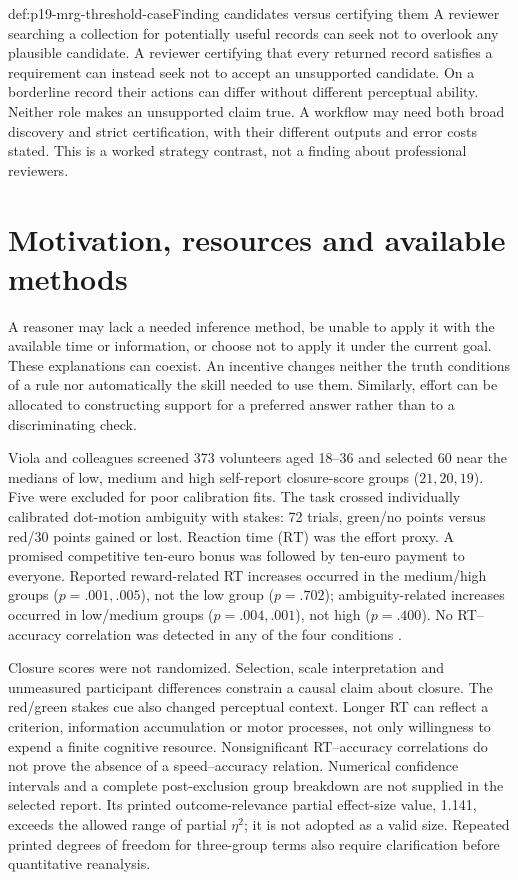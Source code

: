 \begin{hbexample}{def:p19-mrg-threshold-case}{Finding candidates versus certifying them}
A reviewer searching a collection for potentially useful records can seek
not to overlook any plausible candidate. A reviewer certifying that every
returned record satisfies a requirement can instead seek not to accept
an unsupported candidate. On a borderline record their actions can differ
without different perceptual ability. Neither role makes an unsupported
claim true. A workflow may need both broad discovery and strict certification,
with their different outputs and error costs stated. This is a worked
strategy contrast, not a finding about professional reviewers.
\end{hbexample}

\section{Motivation, resources and available methods}
\label{sec:p19-mrg-capacity}

A reasoner may lack a needed inference method, be unable to apply it with
the available time or information, or choose not to apply it under the
current goal. These explanations can coexist. An incentive changes neither
the truth conditions of a rule nor automatically the skill needed to use
them. Similarly, effort can be allocated to constructing support for a
preferred answer rather than to a discriminating check.

Viola and colleagues screened 373 volunteers aged 18--36 and selected 60
near the medians of low, medium and high self-report closure-score groups
(\(21,20,19\)). Five were excluded for poor calibration fits. The task
crossed individually calibrated dot-motion ambiguity with stakes:
72 trials, green/no points versus red/30 points gained or lost.
Reaction time (\(\mathrm{RT}\)) was the effort proxy. A promised competitive
ten-euro bonus was followed by ten-euro payment to everyone.
Reported reward-related RT increases occurred in the medium/high groups
(\(p=.001,.005\)), not the low group (\(p=.702\));
ambiguity-related increases occurred in low/medium groups
(\(p=.004,.001\)), not high (\(p=.400\)).
No RT--accuracy correlation was detected in any of the four conditions
\cite[pp.~4--10, figs.~1--4]{ViolaEtAl2015ClosureMRG}.

Closure scores were not randomized. Selection, scale interpretation and
unmeasured participant differences constrain a causal claim about closure.
The red/green stakes cue also changed perceptual context. Longer RT can
reflect a criterion, information accumulation or motor processes, not only
willingness to expend a finite cognitive resource. Nonsignificant
RT--accuracy correlations do not prove the absence of a speed--accuracy
relation. Numerical confidence intervals and a complete post-exclusion
group breakdown are not supplied in the selected report.
Its printed outcome-relevance partial effect-size value, 1.141, exceeds the
allowed range of partial \(\eta^2\); it is not adopted as a valid size.
Repeated printed degrees of freedom for three-group terms also require
clarification before quantitative reanalysis.

